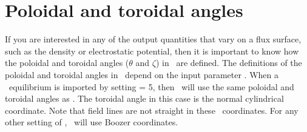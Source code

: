 \section{Poloidal and toroidal angles}

If you are interested in any of the output quantities that vary on a flux surface,
such as the density or electrostatic potential, then it is important to know
how the poloidal and toroidal angles ($\theta$ and $\zeta$) in \sfincs~are defined.
The definitions of the poloidal and toroidal angles in 
\sfincs~depend on the input parameter . When a \vmec~equilibrium is imported by setting
 = 5, then \sfincs~will use the same poloidal and toroidal angles
as \vmec.  The toroidal angle in this case is the normal cylindrical coordinate. Note that field lines
are not straight in these \vmec~coordinates.
For any other setting of , \sfincs~will use Boozer coordinates.


